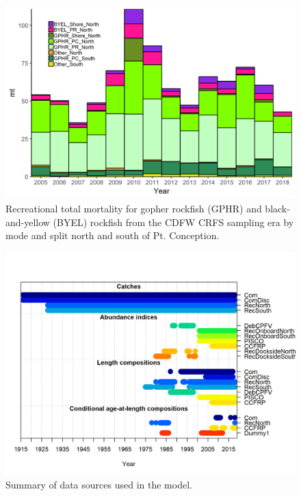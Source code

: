 \documentclass[12pt,]{article}
\begin{document}
\begin{figure}
\centering
\includegraphics{Figures/CRFS_totalmort_gby.png}
\caption{Recreational total mortality for gopher rockfish (GPHR) and
black-and-yellow (BYEL) rockfish from the CDFW CRFS sampling era by mode
and split north and south of Pt. Conception. \label{fig:CFRS_catches}}
\end{figure}

\begin{figure}
\centering
\includegraphics{r4ss/plots_mod1/data_plot.png}
\caption{Summary of data sources used in the model.
\label{fig:data_plot}}
\end{figure}
\end{document}
